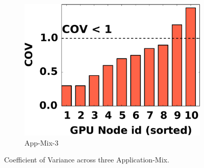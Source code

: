 \begin{figure}[tbp!]
\begin{subfigure}[b]{.15\textwidth}
  \includegraphics[width=.99\linewidth]{figs/app3-cov.pdf}
  \caption{App-Mix-3}
  \label{fig:app3-cov}
\end{subfigure}
\vspace{-2mm}
\caption{Coefficient of Variance across three Application-Mix.}
\label{fig:cov}
\end{figure}
\vspace{-2mm}


